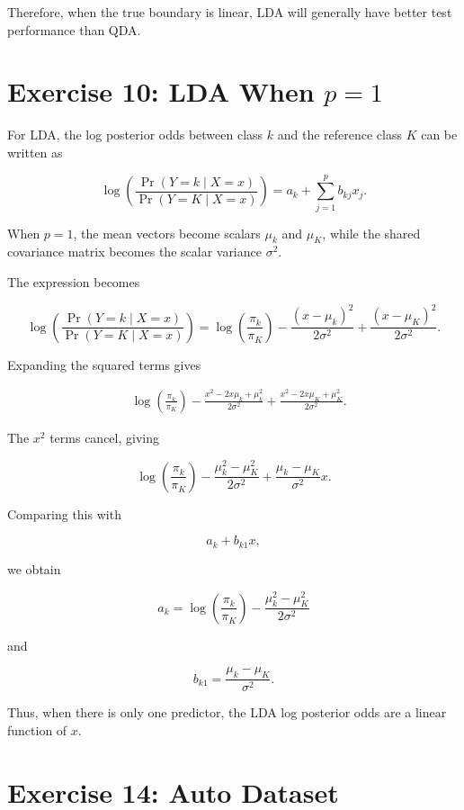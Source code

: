 \documentclass[12pt,a4paper]{article}
\begin{document}
Therefore, when the true boundary is linear, LDA will generally have better
test performance than QDA.


\section{Exercise 10: LDA When $p=1$}

For LDA, the log posterior odds between class $k$ and the reference class
$K$ can be written as

\[
\log
\left(
\frac{\Pr(Y=k\mid X=x)}
{\Pr(Y=K\mid X=x)}
\right)
=
a_k+\sum_{j=1}^{p}b_{kj}x_j.
\]

When $p=1$, the mean vectors become scalars $\mu_k$ and $\mu_K$, while the
shared covariance matrix becomes the scalar variance $\sigma^2$.

The expression becomes

\[
\log
\left(
\frac{\Pr(Y=k\mid X=x)}
{\Pr(Y=K\mid X=x)}
\right)
=
\log\left(\frac{\pi_k}{\pi_K}\right)
-\frac{(x-\mu_k)^2}{2\sigma^2}
+\frac{(x-\mu_K)^2}{2\sigma^2}.
\]

Expanding the squared terms gives

\[
\begin{aligned}
&\log\left(\frac{\pi_k}{\pi_K}\right)
-\frac{x^2-2x\mu_k+\mu_k^2}{2\sigma^2}
+\frac{x^2-2x\mu_K+\mu_K^2}{2\sigma^2}.
\end{aligned}
\]

The $x^2$ terms cancel, giving

\[
\log\left(\frac{\pi_k}{\pi_K}\right)
-\frac{\mu_k^2-\mu_K^2}{2\sigma^2}
+
\frac{\mu_k-\mu_K}{\sigma^2}x.
\]

Comparing this with

\[
a_k+b_{k1}x,
\]

we obtain

\[
\boxed{
a_k =
\log\left(\frac{\pi_k}{\pi_K}\right)
-\frac{\mu_k^2-\mu_K^2}{2\sigma^2}
}
\]

and

\[
\boxed{
b_{k1} =
\frac{\mu_k-\mu_K}{\sigma^2}
}.
\]

Thus, when there is only one predictor, the LDA log posterior odds are a
linear function of $x$.


\section{Exercise 14: Auto Dataset}
\end{document}
